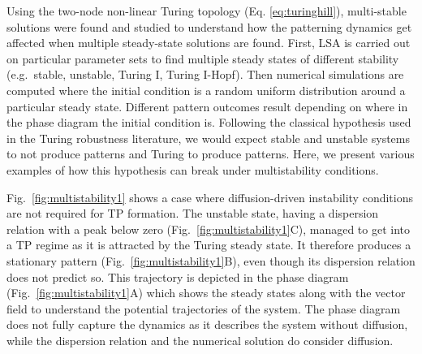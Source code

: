Using the two-node non-linear Turing topology (Eq. \ref{eq:turinghill}), multi-stable solutions were found and studied to understand how the patterning dynamics get affected when multiple steady-state solutions are found.
First, LSA is carried out on particular parameter sets to find multiple steady states of different stability (e.g.~stable, unstable, Turing I, Turing I-Hopf).
Then numerical simulations are computed where the initial condition is a random uniform distribution around a particular steady state.
Different pattern outcomes result depending on where in the phase diagram the initial condition is.
Following the classical hypothesis used in the Turing robustness literature, we would expect stable and unstable systems to not produce patterns and Turing to produce patterns.
Here, we present various examples of how this hypothesis can break under multistability conditions.

Fig.~\ref{fig:multistability1} shows a case where diffusion-driven instability conditions are not required for TP formation.
The unstable state, having a dispersion relation with a peak below zero (Fig.~\ref{fig:multistability1}C), managed to get into a TP regime as it is attracted by the Turing steady state.
It therefore produces a stationary pattern (Fig.~\ref{fig:multistability1}B), even though its dispersion relation does not predict so.
This trajectory is depicted in the phase diagram (Fig.~\ref{fig:multistability1}A) which shows the steady states along with the vector field to understand the potential trajectories of the system.
The phase diagram does not fully capture the dynamics as it describes the system without diffusion, while the dispersion relation and the numerical solution do consider diffusion.

